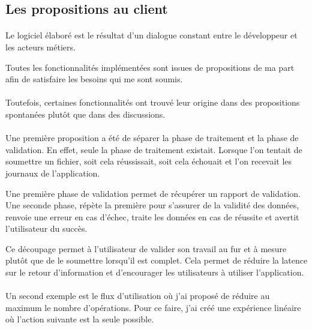 \subsection{Les propositions au client}
\label{subsec:proposals-to-customer}

\paragraph{}
Le logiciel élaboré est le résultat d'un dialogue constant entre le développeur et les acteurs métiers.

Toutes les fonctionnalités implémentées sont issues de propositions de ma part afin de satisfaire les besoins qui me sont soumis.

\paragraph{}
Toutefois, certaines fonctionnalités ont trouvé leur origine dans des propositions spontanées plutôt que dans des discussions.

\paragraph{}
Une première proposition a été de séparer la phase de traitement et la phase de validation.
En effet, seule la phase de traitement existait. 
Lorsque l'on tentait de soumettre un fichier, soit cela réussissait, soit cela échouait et l'on recevait les journaux de l'application\fnmark.

Une première phase de validation permet de récupérer un rapport de validation.
Une seconde phase, répète la première pour s'assurer de la validité des données, renvoie une erreur en cas d'échec\fnmark, traite les données en cas de réussite et avertit l'utilisateur du succès.

Ce découpage permet à l'utilisateur de valider son travail au fur et à mesure plutôt que de le soumettre lorsqu'il est complet.
Cela permet de réduire la latence sur le retour d'information et d'encourager les utilisateurs à utiliser l'application.

\paragraph{}
Un second exemple est le flux d'utilisation où j'ai proposé de réduire au maximum le nombre d'opérations.
Pour ce faire, j'ai créé une expérience linéaire où l'action suivante est la seule possible.

